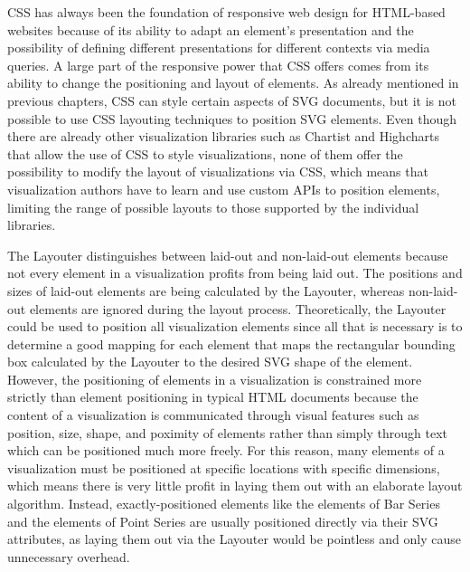 CSS has always been the foundation of responsive web design for HTML-based websites because of its ability to adapt an element's presentation and the possibility of defining different presentations for different contexts via media queries.
A large part of the responsive power that CSS offers comes from its ability to change the positioning and layout of elements.
As already mentioned in previous chapters, CSS can style certain aspects of SVG documents, but it is not possible to use CSS layouting techniques to position SVG elements.
Even though there are already other visualization libraries such as Chartist \parencite{Chartist} and Highcharts \parencite{Highcharts} that allow the use of CSS to style visualizations, none of them offer the possibility to modify the layout of visualizations via CSS, which means that visualization authors have to learn and use custom APIs to position elements, limiting the range of possible layouts to those supported by the individual libraries. 

The Layouter distinguishes between laid-out and non-laid-out elements because not every element in a visualization profits from being laid out.
The positions and sizes of laid-out elements are being calculated by the Layouter, whereas non-laid-out elements are ignored during the layout process.
Theoretically, the Layouter could be used to position all visualization elements since all that is necessary is to determine a good mapping for each element that maps the rectangular bounding box calculated by the Layouter to the desired SVG shape of the element.
However, the positioning of elements in a visualization is constrained more strictly than element positioning in typical HTML documents because the content of a visualization is communicated through visual features such as position, size, shape, and poximity of elements rather than simply through text which can be positioned much more freely.  
For this reason, many elements of a visualization must be positioned at specific locations with specific dimensions, which means there is very little profit in laying them out with an elaborate layout algorithm.
Instead, exactly-positioned elements like the  elements of Bar Series and the  elements of Point Series are usually positioned directly via their SVG attributes, as laying them out via the Layouter would be pointless and only cause unnecessary overhead.

